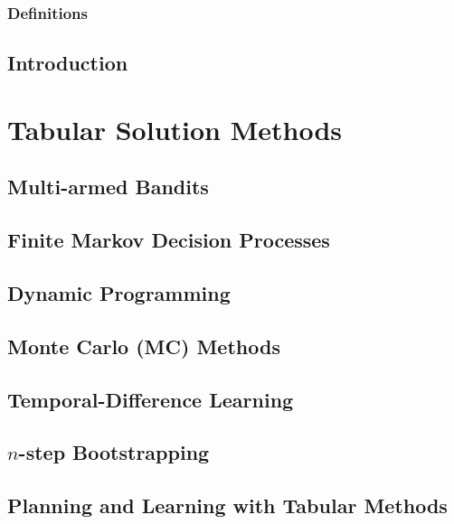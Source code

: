 \documentclass[a4paper,12pt,oneside]{book}
\begin{document}
\tableofcontents

\newpage
\section{Definitions}


\chapter{Introduction}
\label{ch:intro}


\part{Tabular Solution Methods}
\label{part:tabular_solution_methods}
\chapter{Multi-armed Bandits}
\label{ch:multi_armed_bandits}


\chapter{Finite Markov Decision Processes}
\label{ch:finite_mdps}


\chapter{Dynamic Programming}
\label{ch:dp}


\chapter{Monte Carlo (MC) Methods}
\label{ch:mcm}


\chapter{Temporal-Difference Learning}
\label{ch:temporal_difference_learning}


\chapter{$n$-step Bootstrapping}
\label{ch:n_step_bootstrapping}


\chapter{Planning and Learning with Tabular Methods}
\label{ch:planning_and_learning_with_tabular_methods}

\end{document}

